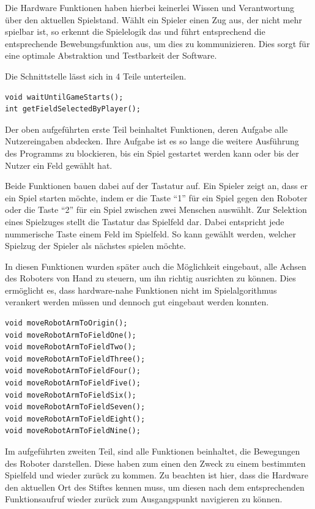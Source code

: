 \documentclass[conference,compsoc,final,a4paper]{IEEEtran}
\begin{document}
Die Hardware Funktionen haben hierbei keinerlei Wissen und Verantwortung über den aktuellen Spielstand.
Wählt ein Spieler einen Zug aus, der nicht mehr spielbar ist, so erkennt die Spielelogik das und führt
entsprechend die entsprechende Bewebungsfunktion aus, um dies zu kommunizieren. Dies sorgt für eine
optimale Abstraktion und Testbarkeit der Software.

Die Schnittstelle lässt sich in 4 Teile unterteilen.

\begin{verbatim}
void waitUntilGameStarts();
int getFieldSelectedByPlayer();
\end{verbatim}

Der oben aufgeführten erste Teil beinhaltet Funktionen, deren Aufgabe alle Nutzereingaben abdecken.
Ihre Aufgabe ist es so lange die weitere Ausführung des Programms zu blockieren,
bis ein Spiel gestartet werden kann oder bis der Nutzer ein Feld gewählt hat.

Beide Funktionen bauen dabei auf der Tastatur auf. Ein Spieler zeigt an, dass er ein Spiel starten
möchte, indem er die Taste \enquote{1} für ein Spiel gegen den Roboter oder die Taste \enquote{2}
für ein Spiel zwischen zwei Menschen auswählt. Zur Selektion eines Spielzuges stellt die Tastatur
das Spielfeld dar. Dabei entspricht jede nummerische Taste einem Feld im Spielfeld. So kann
gewählt werden, welcher Spielzug der Spieler als nächstes spielen möchte.

In diesen Funktionen wurden später auch die Möglichkeit eingebaut, alle Achsen des Roboters von 
Hand zu steuern, um ihn richtig ausrichten zu können. Dies ermöglicht es, dass hardware-nahe Funktionen
nicht im Spielalgorithmus verankert werden müssen und dennoch gut eingebaut werden konnten.

\begin{verbatim}
void moveRobotArmToOrigin();
void moveRobotArmToFieldOne();
void moveRobotArmToFieldTwo();
void moveRobotArmToFieldThree();
void moveRobotArmToFieldFour();
void moveRobotArmToFieldFive();
void moveRobotArmToFieldSix();
void moveRobotArmToFieldSeven();
void moveRobotArmToFieldEight();
void moveRobotArmToFieldNine();
\end{verbatim}

Im aufgeführten zweiten Teil, sind alle Funktionen beinhaltet, die Bewegungen des Roboter darstellen. Diese haben
zum einen den Zweck zu einem bestimmten Spielfeld und wieder zurück zu kommen. Zu beachten ist hier,
dass die Hardware den aktuellen Ort des Stiftes kennen muss, um diesen nach dem entsprechenden Funktionsaufruf
wieder zurück zum Ausgangspunkt navigieren zu können.
\end{document}
